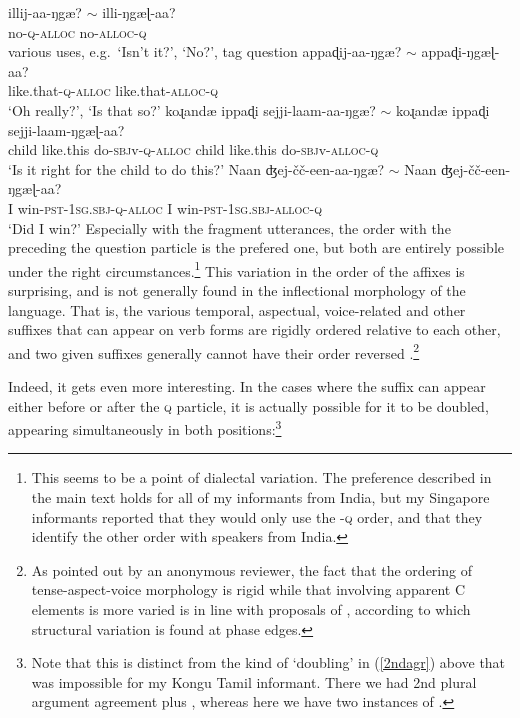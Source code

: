 \documentclass[output=paper, modfonts, nonflat]{langsci/langscibook}
\begin{document}
\ea
 \ea\label{illiya}\gll illij-aa-ŋgæ? $\sim$ illi-ŋgæɭ-aa?\\
 no-\textsc{q}-\textsc{alloc}{} {} no-\textsc{alloc}-\textsc{q}\\
 \glt various uses, e.g.\ `Isn't it?', `No?', tag question
 \ex\label{apdiya}\gll appaɖij-aa-ŋgæ? $\sim$ appaɖi-ŋgæɭ-aa?\\
 like.that-\textsc{q}-\textsc{alloc}{} {} like.that-\textsc{alloc}-\textsc{q}\\
 \glt `Oh really?', `Is that so?' 
 \ex\label{child}\gll koɻandæ{} ippaɖi sejji-laam-aa-ŋgæ? $\sim$
 koɻandæ{} ippaɖi sejji-laam-ŋgæɭ-aa?\\ 
 child like.this do-\textsc{sbj}v-\textsc{q}-\textsc{alloc}{} {} child like.this do-\textsc{sbj}v-\textsc{alloc}-\textsc{q}\\ 
 \glt `Is it right for the child to do this?'
 \ex\label{winning}\gll Naan ʤej-\v{c}\v{c}-een-aa-ŋgæ? $\sim$ Naan ʤej-\v{c}\v{c}-een-ŋgæɭ-aa?\\
 I win-\textsc{pst}-1\textsc{sg}.\textsc{sbj}-\textsc{q}-\textsc{alloc}{} {} I win-\textsc{pst}-1\textsc{sg}.\textsc{sbj}-\textsc{alloc}-\textsc{q}\\
 \glt `Did I win?'
 \z
\z
%
Especially with the fragment utterances, the order with the \allagr{}
preceding the question particle is the prefered one, but both are
entirely possible under the right circumstances.\footnote{This seems
  to be a point of dialectal variation. The preference described in
  the main text holds for all of my informants from India, but my
  Singapore informants reported that they would only use the
  \allagr-\textsc{q} order, and that they identify the other order
  with speakers from India.} This variation in the order of the
affixes is surprising, and is not generally found in the inflectional
morphology of the language. That is, the various temporal, aspectual,
voice-related and other suffixes that can appear on verb forms are
rigidly ordered relative to each other, and two given suffixes
generally cannot have their order reversed \citep[for extended
discussion on this point,
see][]{sundaresanmcfadden:tamtrans}.\footnote{As pointed out by an
  anonymous reviewer, the fact that the ordering of tense-aspect-voice
  morphology is rigid while that involving apparent C elements is more
  varied is in line with proposals of \citet{aboh:2015}, according to
  which structural variation is found at phase edges.}

Indeed, it gets even more interesting. In the cases where the
\allagr{} suffix can appear either before or after the \textsc{q}
particle, it is actually possible for it to be doubled, appearing
simultaneously in both positions:\footnote{Note that this is distinct
  from the kind of `doubling' in (\ref{2ndagr}) above that was
  impossible for my Kongu Tamil informant. There we had 2nd plural
  argument agreement plus \allagr, whereas here we have two instances
  of \allagr.}
\end{document}
